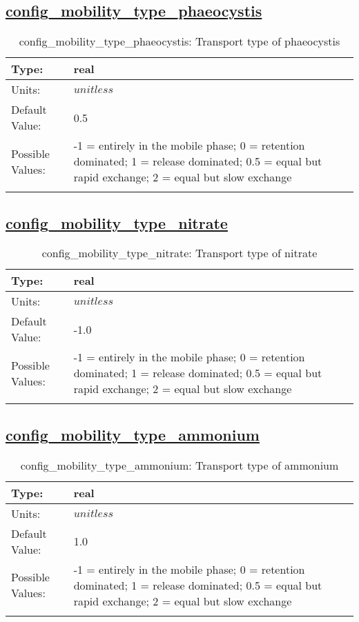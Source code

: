 \subsection[config\_mobility\_type\_phaeocystis]{\hyperref[sec:nm_tab_biogeochemistry]{config\_mobility\_type\_phaeocystis}}
\label{subsec:nm_sec_config_mobility_type_phaeocystis}
\begin{center}
\begin{longtable}{| p{2.0in} || p{4.0in} |}
    \hline
    Type: & real \\
    \hline
    Units: & $unitless$ \\
    \hline
    Default Value: & 0.5 \\
    \hline
    Possible Values: & -1 = entirely in the mobile phase; 0 = retention dominated;     1 = release dominated; 0.5 = equal but rapid exchange;     2 = equal but slow exchange \\
    \hline
    \caption{config\_mobility\_type\_phaeocystis: Transport type of phaeocystis}
\end{longtable}
\end{center}
\subsection[config\_mobility\_type\_nitrate]{\hyperref[sec:nm_tab_biogeochemistry]{config\_mobility\_type\_nitrate}}
\label{subsec:nm_sec_config_mobility_type_nitrate}
\begin{center}
\begin{longtable}{| p{2.0in} || p{4.0in} |}
    \hline
    Type: & real \\
    \hline
    Units: & $unitless$ \\
    \hline
    Default Value: & -1.0 \\
    \hline
    Possible Values: & -1 = entirely in the mobile phase; 0 = retention dominated;     1 = release dominated; 0.5 = equal but rapid exchange;     2 = equal but slow exchange \\
    \hline
    \caption{config\_mobility\_type\_nitrate: Transport type of nitrate}
\end{longtable}
\end{center}
\subsection[config\_mobility\_type\_ammonium]{\hyperref[sec:nm_tab_biogeochemistry]{config\_mobility\_type\_ammonium}}
\label{subsec:nm_sec_config_mobility_type_ammonium}
\begin{center}
\begin{longtable}{| p{2.0in} || p{4.0in} |}
    \hline
    Type: & real \\
    \hline
    Units: & $unitless$ \\
    \hline
    Default Value: & 1.0 \\
    \hline
    Possible Values: & -1 = entirely in the mobile phase; 0 = retention dominated;     1 = release dominated; 0.5 = equal but rapid exchange;     2 = equal but slow exchange \\
    \hline
    \caption{config\_mobility\_type\_ammonium: Transport type of ammonium}
\end{longtable}
\end{center}
